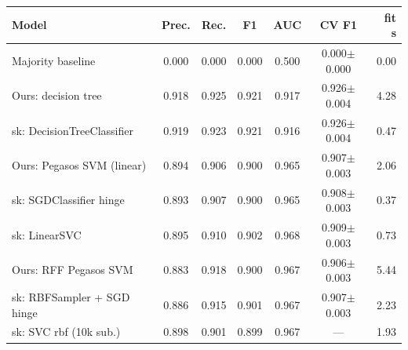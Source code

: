 \begin{tabular}{@{}lcccccr@{}}
\toprule
Model & Prec. & Rec. & F1 & AUC & CV F1 & fit s \\
\midrule
Majority baseline & 0.000 & 0.000 & 0.000 & 0.500 & 0.000$\pm$0.000 & 0.00 \\
Ours: decision tree & 0.918 & 0.925 & 0.921 & 0.917 & 0.926$\pm$0.004 & 4.28 \\
sk: DecisionTreeClassifier & 0.919 & 0.923 & 0.921 & 0.916 & 0.926$\pm$0.004 & 0.47 \\
Ours: Pegasos SVM (linear) & 0.894 & 0.906 & 0.900 & 0.965 & 0.907$\pm$0.003 & 2.06 \\
sk: SGDClassifier hinge & 0.893 & 0.907 & 0.900 & 0.965 & 0.908$\pm$0.003 & 0.37 \\
sk: LinearSVC & 0.895 & 0.910 & 0.902 & 0.968 & 0.909$\pm$0.003 & 0.73 \\
Ours: RFF Pegasos SVM & 0.883 & 0.918 & 0.900 & 0.967 & 0.906$\pm$0.003 & 5.44 \\
sk: RBFSampler + SGD hinge & 0.886 & 0.915 & 0.901 & 0.967 & 0.907$\pm$0.003 & 2.23 \\
sk: SVC rbf (10k sub.) & 0.898 & 0.901 & 0.899 & 0.967 & --- & 1.93 \\
\bottomrule
\end{tabular}
